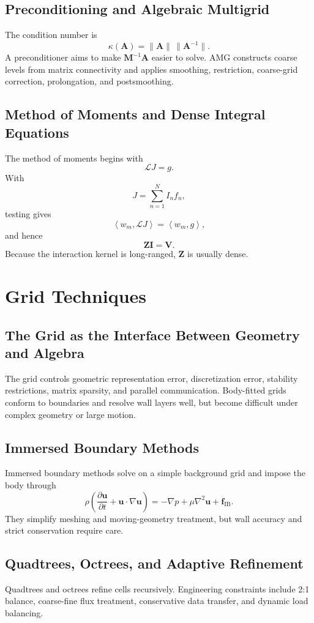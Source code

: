 \documentclass[11pt,openany]{book}
\newcommand{\Lop}{\mathcal L}
\newcommand{\avg}[1]{\left\langle #1\right\rangle}
\begin{document}
\chapter*{Preconditioning and Algebraic Multigrid}
The condition number is
\[
\kappa(\bm A)=\|\bm A\|\,\|\bm A^{-1}\|.
\]
A preconditioner aims to make $\bm M^{-1}\bm A$ easier to solve. AMG constructs coarse levels from matrix connectivity and applies smoothing, restriction, coarse-grid correction, prolongation, and postsmoothing.

\chapter*{Method of Moments and Dense Integral Equations}
The method of moments begins with
\[
\Lop J=g.
\]
With
\[
J=\sum_{n=1}^N I_nf_n,
\]
testing gives
\[
\avg{w_m,\Lop J}=\avg{w_m,g},
\]
and hence
\[
\bm Z\bm I=\bm V.
\]
Because the interaction kernel is long-ranged, $\bm Z$ is usually dense.

\part{Grid Techniques}

\chapter*{The Grid as the Interface Between Geometry and Algebra}
The grid controls geometric representation error, discretization error, stability restrictions, matrix sparsity, and parallel communication. Body-fitted grids conform to boundaries and resolve wall layers well, but become difficult under complex geometry or large motion.

\chapter*{Immersed Boundary Methods}
Immersed boundary methods solve on a simple background grid and impose the body through
\[
\rho\left(\frac{\partial\bm u}{\partial t}+\bm u\cdot\nabla\bm u\right)=-\nabla p+\mu\nabla^2\bm u+\bm f_{\mathrm{IB}}.
\]
They simplify meshing and moving-geometry treatment, but wall accuracy and strict conservation require care.

\chapter*{Quadtrees, Octrees, and Adaptive Refinement}
Quadtrees and octrees refine cells recursively. Engineering constraints include 2:1 balance, coarse-fine flux treatment, conservative data transfer, and dynamic load balancing.
\end{document}
